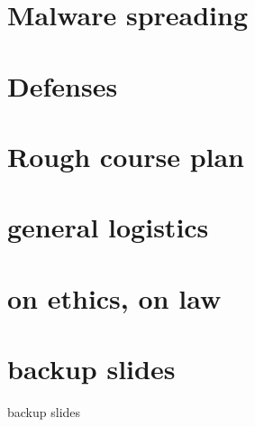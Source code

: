 \section{Malware spreading}


\section{Defenses}



\section{Rough course plan}


\section{general logistics}


\section{on ethics, on law}







\section{backup slides}
\begin{frame}{backup slides}
\end{frame}




